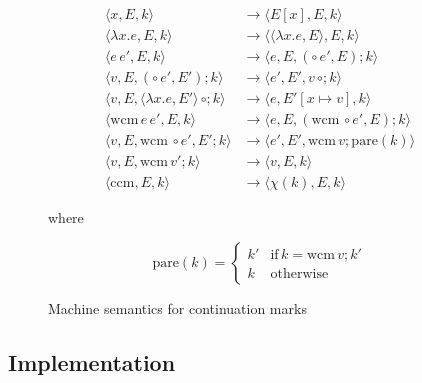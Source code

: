 \documentclass[ms]{byuprop}
\begin{document}
\begin{figure}
\begin{align*}
\langle x,E,k\rangle                                       &\rightarrow\langle E[x],E,k\rangle\\
\langle\lambda x.e,E,k\rangle                              &\rightarrow\langle \langle\lambda x.e,E\rangle,E,k\rangle\\
\langle e\,e',E,k\rangle                                   &\rightarrow\langle e,E,(\circ\,e',E);k\rangle\\
\langle v,E,(\circ\,e',E');k\rangle                      &\rightarrow\langle e',E',v\,\circ;k\rangle\\
\langle v,E,\langle\lambda x.e,E'\rangle\,\circ;k\rangle &\rightarrow\langle e,E'[x\mapsto v],k\rangle\\
\langle \mathrm{wcm}\,e\,e',E,k\rangle                     &\rightarrow\langle e,E,(\mathrm{wcm}\,\circ e',E);k\rangle\\
\langle v,E,\mathrm{wcm}\,\circ e',E';k\rangle           &\rightarrow\langle e',E',\mathrm{wcm}\,v;\mathrm{pare}(k)\rangle\\
\langle v,E,\mathrm{wcm}\,v';k\rangle                      &\rightarrow\langle v,E,k\rangle\\
\langle \mathrm{ccm},E,k\rangle                            &\rightarrow\langle \chi(k),E,k\rangle
\end{align*}

where 

\[
\mathrm{pare}(k)=
\left\{
\begin{array}{lr}
k' & \mathrm{if}\,k=\mathrm{wcm}\,v;k'\\
k & \mathrm{otherwise}
\end{array}
\right.
\]

\caption{Machine semantics for continuation marks}
\label{machine-semantics}
\end{figure}


\subsection{Implementation} 
\end{document}
